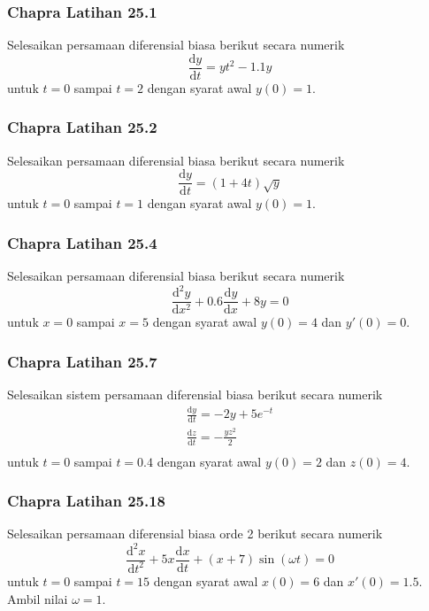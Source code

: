 \begin{frame}
\frametitle{Chapra Latihan 25.1}

Selesaikan persamaan diferensial biasa berikut secara numerik
\begin{equation*}
\frac{\mathrm{d} y}{\mathrm{d}t} = yt^2 - 1.1y
\end{equation*}
untuk $t = 0$ sampai $t=2$
dengan syarat awal $y(0) = 1$.

\end{frame}



\begin{frame}
\frametitle{Chapra Latihan 25.2}

Selesaikan persamaan diferensial biasa berikut secara numerik
\begin{equation*}
\frac{\mathrm{d} y}{\mathrm{d}t} = (1 + 4t)\sqrt{y}
\end{equation*}
untuk $t = 0$ sampai $t=1$
dengan syarat awal $y(0) = 1$.

\end{frame}



\begin{frame}
\frametitle{Chapra Latihan 25.4}

Selesaikan persamaan diferensial biasa berikut secara numerik
\begin{equation*}
\frac{\mathrm{d}^2 y}{\mathrm{d}x^2} + 0.6\frac{\mathrm{d}y}{\mathrm{d}x} + 8y = 0
\end{equation*}
untuk $x = 0$ sampai $x=5$
dengan syarat awal $y(0) = 4$ dan $y'(0) = 0$.

\end{frame}


\begin{frame}
\frametitle{Chapra Latihan 25.7}

Selesaikan sistem persamaan diferensial biasa berikut secara numerik
\begin{align*}
\frac{\mathrm{d}y}{\mathrm{d}t} = -2y + 5e^{-t} \\
\frac{\mathrm{d}z}{\mathrm{d}t} = -\frac{yz^2}{2} \\
\end{align*}
untuk $t = 0$ sampai $t=0.4$
dengan syarat awal $y(0) = 2$ dan $z(0) = 4$.

\end{frame}



\begin{frame}
\frametitle{Chapra Latihan 25.18}

Selesaikan persamaan diferensial biasa orde 2 berikut secara numerik
\begin{equation*}
\frac{\mathrm{d}^2 x}{\mathrm{d}t^2} + 5x \frac{\mathrm{d}x}{\mathrm{d}t} +
(x + 7) \sin(\omega t) = 0
\end{equation*}
untuk $t = 0$ sampai $t=15$
dengan syarat awal $x(0) = 6$ dan $x'(0) = 1.5$.
Ambil nilai $\omega = 1$.

\end{frame}


